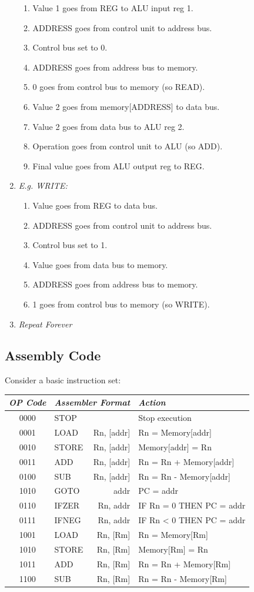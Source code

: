 \documentclass[twocolumn,english]{article}
\providecommand{\tabularnewline}{\\}
\begin{document}
\begin{enumerate}
\begin{enumerate}
\item Value 1 goes from REG to ALU input reg 1.
\item ADDRESS goes from control unit to address bus.
\item Control bus set to 0.
\item ADDRESS goes from address bus to memory.
\item 0 goes from control bus to memory (so READ).
\item Value 2 goes from memory{[}ADDRESS{]} to data bus.
\item Value 2 goes from data bus to ALU reg 2.
\item Operation goes from control unit to ALU (so ADD).
\item Final value goes from ALU output reg to REG.
\end{enumerate}
\item \emph{E.g. WRITE:}

\begin{enumerate}
\item Value goes from REG to data bus.
\item ADDRESS goes from control unit to address bus.
\item Control bus set to 1.
\item Value goes from data bus to memory.
\item ADDRESS goes from address bus to memory.
\item 1 goes from control bus to memory (so WRITE).
\end{enumerate}
\item \emph{Repeat Forever}
\end{enumerate}

\subsection{Assembly Code}

Consider a basic instruction set:

\begin{table}[H]
\noindent \centering{}%
\begin{tabular}{clrl}
\toprule 
\emph{OP Code} & \multicolumn{2}{c}{\emph{Assembler Format}} & \emph{Action}\tabularnewline
\midrule
0000 & STOP &  & Stop execution\tabularnewline
0001 & LOAD & Rn, {[}addr{]} & Rn = Memory{[}addr{]}\tabularnewline
0010 & STORE & Rn, {[}addr{]} & Memory{[}addr{]} = Rn\tabularnewline
0011 & ADD & Rn, {[}addr{]} & Rn = Rn + Memory{[}addr{]}\tabularnewline
0100 & SUB & Rn, {[}addr{]} & Rn = Rn - Memory{[}addr{]}\tabularnewline
1010 & GOTO & addr & PC = addr\tabularnewline
0110 & IFZER & Rn, addr & IF Rn = 0 THEN PC = addr\tabularnewline
0111 & IFNEG & Rn, addr & IF Rn \textless{} 0 THEN PC = addr\tabularnewline
1001 & LOAD & Rn, {[}Rm{]} & Rn = Memory{[}Rm{]}\tabularnewline
1010 & STORE & Rn, {[}Rm{]} & Memory{[}Rm{]} = Rn\tabularnewline
1011 & ADD & Rn, {[}Rm{]} & Rn = Rn + Memory{[}Rm{]}\tabularnewline
1100 & SUB & Rn, {[}Rm{]} & Rn = Rn - Memory{[}Rm{]}\tabularnewline
\bottomrule
\end{tabular}
\end{table}
\end{document}

